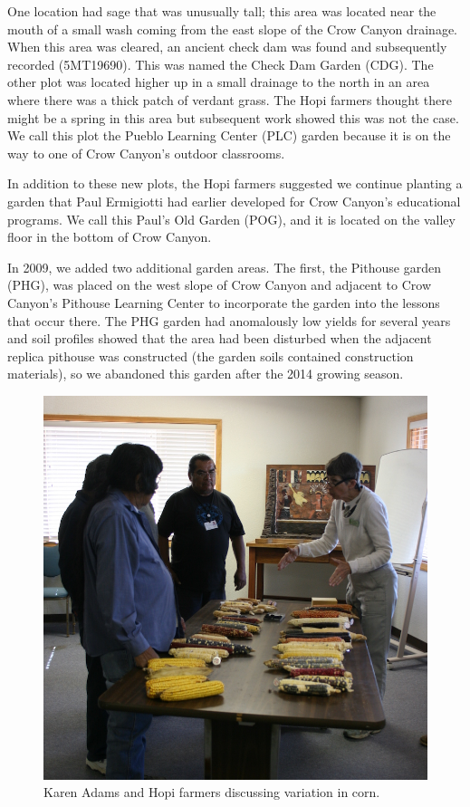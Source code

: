 \documentclass[12pt,]{article}
\begin{document}
One location had sage that was unusually tall; this area was located near the mouth of a small wash coming from the east slope of the Crow Canyon drainage. When this area was cleared, an ancient check dam was found and subsequently recorded (5MT19690). This was named the Check Dam Garden (CDG). The other plot was located higher up in a small drainage to the north in an area where there was a thick patch of verdant grass. The Hopi farmers thought there might be a spring in this area but subsequent work showed this was not the case. We call this plot the Pueblo Learning Center (PLC) garden because it is on the way to one of Crow Canyon's outdoor classrooms.

In addition to these new plots, the Hopi farmers suggested we continue planting a garden that Paul Ermigiotti had earlier developed for Crow Canyon's educational programs. We call this Paul's Old Garden (POG), and it is located on the valley floor in the bottom of Crow Canyon.

In 2009, we added two additional garden areas. The first, the Pithouse garden (PHG), was placed on the west slope of Crow Canyon and adjacent to Crow Canyon's Pithouse Learning Center to incorporate the garden into the lessons that occur there. The PHG garden had anomalously low yields for several years and soil profiles showed that the area had been disturbed when the adjacent replica pithouse was constructed (the garden soils contained construction materials), so we abandoned this garden after the 2014 growing season.

\begin{figure}
\centering
\includegraphics{./images/karen_and_hopi.jpg}
\caption{Karen Adams and Hopi farmers discussing variation in corn.}
\end{figure}
\end{document}
